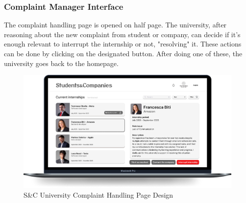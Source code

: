 \subsubsection{Complaint Manager Interface}
The complaint handling page is opened on half page. The university, after reasoning about the new complaint from student or company, can decide if it's enough relevant to interrupt the internship or not, "resolving" it. These actions can be done by clicking on the designated button. After doing one of these, the university goes back to the homepage. \\

\begin{figure}[H]
    \centering
    \includegraphics[width=0.9\linewidth]{Images/Mock-up/University complaint handle.png}
    \caption{S\&C University Complaint Handling Page Design}
    \label{fig:homepage-design}
\end{figure}